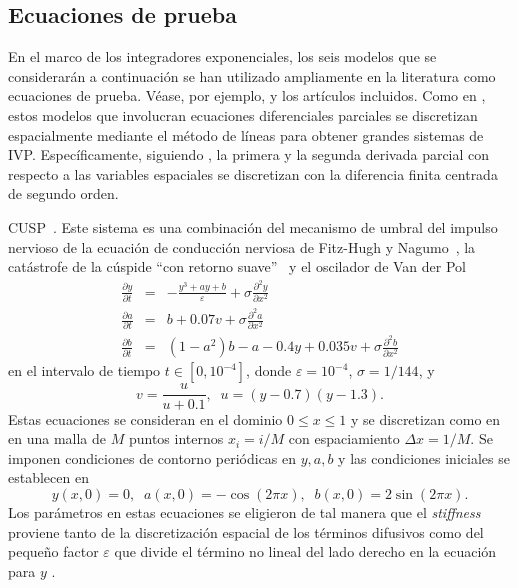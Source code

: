 \subsection{Ecuaciones de prueba}\label{section:test-eq}
En el marco de los integradores exponenciales, los seis modelos que se considerarán a continuación se han utilizado ampliamente en la literatura como ecuaciones de prueba. Véase, por ejemplo, \cite{tokman2006efficient,tokman2012new,tokman2013comparative} y los artículos incluidos. Como en \cite{tokman2006efficient,tokman2012new,tokman2013comparative}, estos modelos que involucran ecuaciones diferenciales parciales se discretizan espacialmente mediante el método de líneas para obtener grandes sistemas de IVP. Específicamente, siguiendo \cite{tokman2006efficient,tokman2012new,tokman2013comparative}, la primera y la segunda derivada parcial con respecto a las variables espaciales se discretizan con la diferencia finita centrada de segundo orden.

\begin{example}
    \label{ex:cusp} CUSP~\cite{wanner1996solving,tokman2006efficient}. Este sistema es una combinación del mecanismo de umbral del impulso nervioso de la ecuación de conducción nerviosa de Fitz-Hugh y Nagumo~\cite{fitzhugh1969mathematical,nagumo1962active}, la catástrofe de la cúspide ``con retorno suave''~\cite{zeeman1973differential} y el oscilador de Van  der Pol
    \begin{eqnarray*}
        \frac{\partial y}{\partial t} &=& -\frac{y^{3}+ay+b}{\varepsilon}+\sigma\frac{\partial^{2}y}{\partial x^{2}}\\
        \frac{\partial a}{\partial t} &=& b+0\mathord{.}07v+\sigma \frac{\partial^{2}a}{\partial x^{2}}\\
        \frac{\partial b}{\partial t} &=& (1-a^{2})b-a-0\mathord{.}4y+0\mathord{.}035v+\sigma\frac{\partial^{2}b}{\partial x^{2}}
    \end{eqnarray*}
    en el intervalo de tiempo $t\in [0,10^{-4}]$, donde $\varepsilon=10^{-4}$, $\sigma=1/144$, y
    \[ v= \frac{u}{u+0\mathord{.}1},\;\; u=(y-0\mathord{.}7)(y-1\mathord{.}3).\]
    Estas ecuaciones se consideran en el dominio $0\leq x\leq 1$ y se discretizan como en \cite{tokman2006efficient} en una malla de $M$ puntos internos $x_i = i/M$ con espaciamiento $\Delta x=1/M$. Se imponen condiciones de contorno periódicas en $y,a,b$ y las condiciones iniciales se establecen en
    \[y(x, 0)=0,\;\;a(x, 0)=-\cos(2\pi x),\;\;b(x, 0)=2\sin(2\pi x).\]
    Los parámetros en estas ecuaciones se eligieron de tal manera que el \textit{stiffness} proviene tanto de la discretización espacial de los términos difusivos como del pequeño factor $\varepsilon$ que divide el término no lineal del lado derecho en la ecuación para $y$ .
\end{example}

